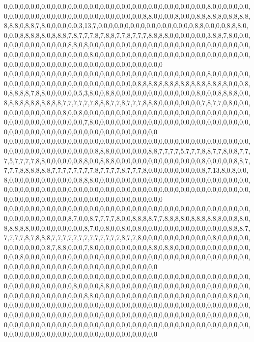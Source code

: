 0,0,0,0,0,0,0,0,0,0,0,0,0,0,0,0,0,0,0,0,0,0,0,0,0,0,0,0,0,0,0,0,0,0,0,0,0,0,8,0,0,0,0,0,0,0,0,0,0,0,0,0,0,0,0,0,0,0,0,0,0,0,0,0,0,0,0,0,0,0,0,0,8,8,0,0,0,0,8,0,0,0,8,8,8,8,8,0,8,8,8,8,8,8,8,0,8,8,7,8,0,0,0,0,0,0,3,13,7,0,0,0,0,0,0,0,0,0,0,0,0,0,0,0,0,0,0,8,8,0,0,0,0,8,8,8,0,0,0,0,8,8,8,8,8,0,8,8,8,7,8,7,7,7,8,7,8,8,7,7,8,7,7,7,8,8,8,8,0,0,0,0,0,0,0,3,8,8,7,8,0,0,0,0,0,0,0,0,0,0,0,0,0,0,0,8,8,0,8,0,0,0,0,0,0,0,0,0,0,0,0,0,0,0,0,0,0,0,0,0,0,0,0,0,0,0,0,0,0,0,0,0,0,0,0,0,0,0,0,0,0,0,0,0,0,8,0,0,0,0,0,0,0,0,0,0,0,0,0,0,0,0,0,0,0,0,0,0,0,0,0,0,0,0,0,0,0,0,0,0,0,0,0,0,0,0,0,0,0,0,0,0,0,0,0,0,0,0,0,0,0,0,0,0,0
0,0,0,0,0,0,0,0,0,0,0,0,0,0,0,0,0,0,0,0,0,0,0,0,0,0,0,0,0,0,0,0,0,0,0,0,0,0,8,0,0,0,0,0,0,0,0,0,0,0,0,0,0,0,0,0,0,0,0,0,0,0,0,0,0,0,0,0,0,0,0,8,8,8,8,8,8,8,8,8,8,8,8,8,8,8,8,8,0,0,0,8,0,8,8,8,8,7,8,8,0,0,0,0,0,0,5,3,8,0,0,8,8,0,0,0,0,0,0,0,0,0,0,0,0,0,0,0,8,0,0,0,8,8,8,8,0,0,8,8,8,8,8,8,8,8,8,8,8,7,7,7,7,7,7,8,8,8,7,7,8,7,7,7,8,8,8,0,0,0,0,0,0,0,0,7,8,7,7,0,8,0,0,0,0,0,0,0,0,0,0,0,0,0,0,8,0,0,8,0,0,0,0,0,0,0,0,0,0,0,0,0,0,0,0,0,0,0,0,0,0,0,0,0,0,0,0,0,0,0,0,0,0,0,0,0,0,0,0,0,0,0,0,0,0,7,8,0,0,0,0,0,0,0,0,0,0,0,0,0,0,0,0,0,0,0,0,0,0,0,0,0,0,0,0,0,0,0,0,0,0,0,0,0,0,0,0,0,0,0,0,0,0,0,0,0,0,0,0,0,0,0,0,0,0
0,0,0,0,0,0,0,0,0,0,0,0,0,0,0,0,0,0,0,0,0,0,0,0,0,0,0,0,0,0,0,0,0,0,0,0,0,0,0,0,0,0,0,0,0,0,0,0,0,0,0,0,0,0,0,0,0,0,0,0,0,0,0,8,8,8,0,0,0,0,0,0,0,8,8,7,7,7,7,5,7,7,7,8,8,7,7,8,0,8,7,7,7,5,7,7,7,7,8,8,0,0,0,0,0,0,8,8,0,0,8,8,8,0,0,0,0,0,0,0,0,0,0,0,0,0,0,0,0,8,0,0,0,0,0,8,8,7,7,7,7,8,8,8,8,8,8,7,7,7,7,7,7,7,7,8,7,7,7,7,8,7,7,7,8,0,0,0,0,0,0,0,0,0,0,8,7,13,8,0,8,0,0,8,0,0,0,0,0,0,0,0,0,0,0,0,0,8,8,8,0,0,0,0,0,0,0,0,0,0,0,0,0,0,0,0,0,0,0,0,0,0,0,0,0,0,0,0,0,0,0,0,0,0,0,0,0,0,0,0,0,0,0,0,0,0,0,0,0,0,0,0,0,0,0,0,0,0,0,0,0,0,0,0,0,0,0,0,0,0,0,0,0,0,0,0,0,0,0,0,0,0,0,0,0,0,0,0,0,0,0,0,0,0,0,0,0,0,0,0,0,0,0,0,0
0,0,0,0,0,0,0,0,0,0,0,0,0,0,0,0,0,0,0,0,0,0,0,0,0,0,0,0,0,0,0,0,0,0,0,0,0,0,0,0,0,0,0,0,0,0,0,0,0,0,0,0,0,0,0,0,0,0,8,7,0,0,8,7,7,7,7,8,0,0,8,8,8,8,7,7,8,8,8,8,0,8,8,8,8,8,8,0,0,8,8,0,8,8,8,8,8,0,0,0,0,0,0,0,0,0,0,8,7,0,0,8,0,0,8,0,0,8,0,0,0,0,0,0,0,0,0,0,0,0,0,0,0,0,8,8,8,7,7,7,7,7,8,7,8,8,8,7,7,7,7,7,7,7,7,7,7,7,7,7,8,7,7,8,0,0,0,0,0,0,0,0,0,0,0,0,0,8,0,0,0,0,0,0,0,0,0,0,0,0,0,0,8,7,8,8,0,0,0,7,8,0,0,0,0,0,0,0,0,0,0,8,8,0,8,8,0,0,0,0,0,0,0,0,0,0,0,0,0,0,0,0,0,8,0,0,0,0,0,0,0,0,0,0,0,0,0,0,0,0,0,0,0,0,0,0,0,0,0,0,0,0,0,0,0,0,0,0,0,0,0,0,0,0,0,0,0,0,0,0,0,0,0,0,0,0,0,0,0,0,0,0,0,0,0,0,0,0,0,0,0,0,0,0,0
0,0,0,0,0,0,0,0,0,0,0,0,0,0,0,0,0,0,0,0,0,0,0,0,0,0,0,0,0,0,0,0,0,0,0,0,0,0,0,0,0,0,0,0,0,0,0,0,0,0,0,0,0,0,0,0,0,0,0,8,0,0,0,0,8,8,0,0,0,0,0,0,0,0,0,0,0,0,0,0,0,0,0,0,0,0,0,0,0,0,0,0,0,0,0,0,0,0,0,0,0,0,0,0,0,0,0,8,8,0,0,0,0,0,0,0,0,0,0,0,0,0,0,0,0,0,0,0,0,0,0,0,0,0,8,0,0,0,0,0,0,0,0,0,0,0,0,0,0,0,0,0,0,0,0,0,0,0,0,0,0,0,0,0,0,0,0,0,0,0,0,0,0,0,0,0,0,0,0,0,0,0,0,0,0,0,0,0,0,0,0,0,0,0,0,0,0,0,0,0,0,0,0,0,0,0,0,0,0,0,0,0,0,0,0,0,0,0,0,0,0,0,0,0,0,0,0,0,0,0,0,0,0,0,0,0,0,0,0,0,0,0,0,0,0,0,0,0,0,0,0,0,0,0,0,0,0,0,0,0,0,0,0,0,0,0,0,0,0,0,0,0,0,0,0,0,0,0,0,0,0,0,0,0,0,0,0,0,0,0,0,0,0,0,0,0,0,0,0,0,0,0,0,0,0
